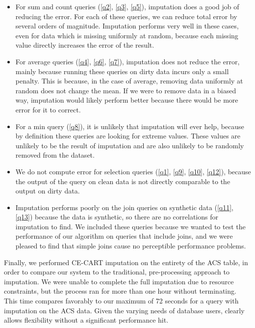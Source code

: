 \begin{itemize}
\item For sum and count queries (\ref{q2}, \ref{q3}, \ref{q5}), imputation does a good job of reducing the error.
For each of these queries, we can reduce total error by several orders of magnitude.
Imputation performs very well in these cases, even for data which is missing uniformly at random, because each missing value directly increases the error of the result.

\item For average queries (\ref{q4}, \ref{q6}, \ref{q7}), imputation does not reduce the error, mainly because running these queries on dirty data incurs only a small penalty.
This is because, in the case of average, removing data uniformly at random does not change the mean.
If we were to remove data in a biased way, imputation would likely perform better because there would be more error for it to correct.

\item For a min query (\ref{q8}), it is unlikely that imputation will ever help, because by definition these queries are looking for extreme values.
These values are unlikely to be the result of imputation and are also unlikely to be randomly removed from the dataset.

\item We do not compute error for selection queries (\ref{q1}, \ref{q9}, \ref{q10}, \ref{q12}), because the output of the query on clean data is not directly comparable to the output on dirty data.

  \item Imputation performs poorly on the join queries on synthetic data (\ref{q11}, \ref{q13}) because the data is synthetic, so there are no correlations for imputation to find. We included these queries because we wanted to test the performance of our algorithm on queries that include joins, and we were pleased to find that simple joins cause no perceptible performance problems.
\end{itemize}

Finally, we performed CE-CART imputation on the entirety of the ACS table, in order to compare our system to the traditional, pre-processing approach to imputation.
We were unable to complete the full imputation due to resource constraints, but the process ran for more than one hour without terminating.
This time compares favorably to our maximum of 72 seconds for a query with imputation on the ACS data.
Given the varying needs of database users, \ProjectName{} clearly allows flexibility without a significant performance hit.


